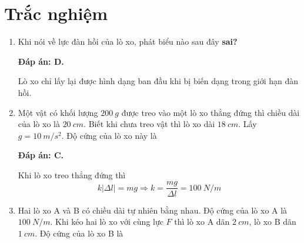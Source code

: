 \section{Trắc nghiệm}
\begin{enumerate}[label=\bfseries Câu \arabic*:]
	\item {}
	
	
	{
		Khi nói về lực đàn hồi của lò xo, phát biểu nào sau đây \textbf{sai?}
	}
	
	\hideall
	{	
		\textbf{Đáp án: D.}
		
		Lò xo chỉ lấy lại được hình dạng ban đầu khi bị biến dạng trong giới hạn đàn hồi.
	}
	\item {}
	
	
	{
		Một vật có khối lượng $\SI{200}{g}$ được treo vào một lò xo thẳng đứng thì chiều dài của lò xo là $\SI{20}{cm}$. Biết khi chưa treo vật thì lò xo dài $\SI{18}{cm}$. Lấy $g=\SI{10}{m/s^2}$. Độ cứng của lò xo này là
	}
	
	\hideall
	{	
		\textbf{Đáp án: C.}
		
		Khi lò xo treo thẳng đứng thì
		$$k|\Delta l| = mg \Rightarrow k =\dfrac{mg}{\Delta l} = \SI{100}{N/m}$$
	}
	\item {}
	
	
	{
		Hai lò xo A và B có chiều dài tự nhiên bằng nhau. Độ cứng của lò xo A là $\SI{100}{N/m}$. Khi kéo hai lò xo với cùng lực $F$ thì lò xo A dãn $\SI{2}{cm}$, lò xo B dãn $\SI{1}{cm}$. Độ cứng của lò xo B là
	}
	

\end{enumerate}

